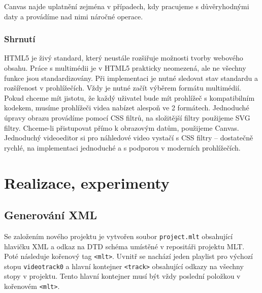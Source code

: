Canvas najde uplatnění zejména v případech, kdy pracujeme s důvěryhodnými daty a provádíme nad nimi náročné operace. 

\subsection{Shrnutí}
HTML5 je živý standard, který neustále rozšiřuje možnosti tvorby webového obsahu. Práce s multimédii je v HTML5 prakticky neomezená, ale ne všechny funkce jsou standardizovány. Při implementaci je nutné sledovat stav standardu a rozšířenost v prohlížečích. Vždy je nutné začít výběrem formátu multimédií. Pokud chceme mít jistotu, že každý uživatel bude mít prohlížeč s kompatibilním kodekem, musíme prohlížeči videa nabízet alespoň ve 2 formátech. Jednoduché úpravy obrazu provádíme pomocí CSS filtrů, na složitější filtry použijeme SVG filtry. Chceme-li přistupovat přímo k obrazovým datům, použijeme Canvas. Jednoduchý videoeditor si pro náhledové video vystačí s CSS filtry -- dostatečně rychlé, na implementaci jednoduché a s podporou v moderních prohlížečích.

\chapter{Realizace, experimenty}

\section{Generování XML}
Se založením nového projektu je vytvořen soubor \texttt{project.mlt} obsahující hlavičku XML a odkaz na DTD schéma umístěné v repositáři projektu MLT. Poté následuje kořenový tag \texttt{<mlt>}. Uvnitř se nachází jeden playlist pro výchozí stopu \texttt{videotrack0} a hlavní kontejner \texttt{<track>} obsahující odkazy na všechny stopy v projektu. Tento hlavní kontejner musí být vždy poslední položkou v kořenovém \texttt{<mlt>}.

